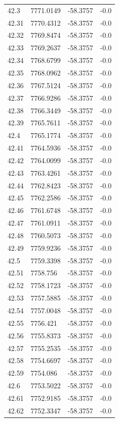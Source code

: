 \begin{table}[H]
\begin{tabular}{llll}
42.3 & 7771.0149 & -58.3757 & -0.0 \\
42.31 & 7770.4312 & -58.3757 & -0.0 \\
42.32 & 7769.8474 & -58.3757 & -0.0 \\
42.33 & 7769.2637 & -58.3757 & -0.0 \\
42.34 & 7768.6799 & -58.3757 & -0.0 \\
42.35 & 7768.0962 & -58.3757 & -0.0 \\
42.36 & 7767.5124 & -58.3757 & -0.0 \\
42.37 & 7766.9286 & -58.3757 & -0.0 \\
42.38 & 7766.3449 & -58.3757 & -0.0 \\
42.39 & 7765.7611 & -58.3757 & -0.0 \\
42.4 & 7765.1774 & -58.3757 & -0.0 \\
42.41 & 7764.5936 & -58.3757 & -0.0 \\
42.42 & 7764.0099 & -58.3757 & -0.0 \\
42.43 & 7763.4261 & -58.3757 & -0.0 \\
42.44 & 7762.8423 & -58.3757 & -0.0 \\
42.45 & 7762.2586 & -58.3757 & -0.0 \\
42.46 & 7761.6748 & -58.3757 & -0.0 \\
42.47 & 7761.0911 & -58.3757 & -0.0 \\
42.48 & 7760.5073 & -58.3757 & -0.0 \\
42.49 & 7759.9236 & -58.3757 & -0.0 \\
42.5 & 7759.3398 & -58.3757 & -0.0 \\
42.51 & 7758.756 & -58.3757 & -0.0 \\
42.52 & 7758.1723 & -58.3757 & -0.0 \\
42.53 & 7757.5885 & -58.3757 & -0.0 \\
42.54 & 7757.0048 & -58.3757 & -0.0 \\
42.55 & 7756.421 & -58.3757 & -0.0 \\
42.56 & 7755.8373 & -58.3757 & -0.0 \\
42.57 & 7755.2535 & -58.3757 & -0.0 \\
42.58 & 7754.6697 & -58.3757 & -0.0 \\
42.59 & 7754.086 & -58.3757 & -0.0 \\
42.6 & 7753.5022 & -58.3757 & -0.0 \\
42.61 & 7752.9185 & -58.3757 & -0.0 \\
42.62 & 7752.3347 & -58.3757 & -0.0 \\

\end{tabular}
\end{table}
